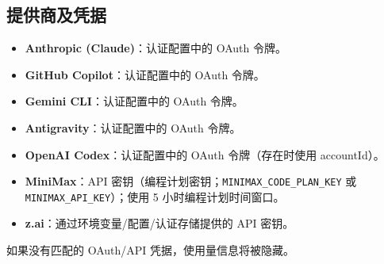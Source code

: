 \subsection{提供商及凭据}


\begin{itemize}
  \item \textbf{Anthropic (Claude)}：认证配置中的 OAuth 令牌。
  \item \textbf{GitHub Copilot}：认证配置中的 OAuth 令牌。
  \item \textbf{Gemini CLI}：认证配置中的 OAuth 令牌。
  \item \textbf{Antigravity}：认证配置中的 OAuth 令牌。
  \item \textbf{OpenAI Codex}：认证配置中的 OAuth 令牌（存在时使用 accountId）。
  \item \textbf{MiniMax}：API 密钥（编程计划密钥；\texttt{MINIMAX\_CODE\_PLAN\_KEY} 或 \texttt{MINIMAX\_API\_KEY}）；使用 5 小时编程计划时间窗口。
  \item \textbf{z.ai}：通过环境变量/配置/认证存储提供的 API 密钥。
\end{itemize}


如果没有匹配的 OAuth/API 凭据，使用量信息将被隐藏。


\clearpage
